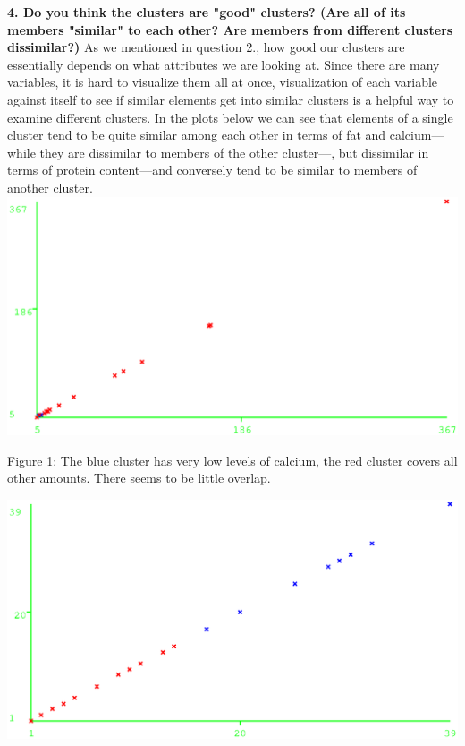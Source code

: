 \documentclass[]{article}
\begin{document}
\noindent\textbf{4. Do you think the clusters are "good" clusters? (Are all of its members "similar" to each other? Are members from different clusters dissimilar?)}
As we mentioned in question 2., how good our clusters are essentially depends on what attributes we are looking at. Since there are many variables, it is hard to visualize them all at once, visualization of each variable against itself to see if similar elements get into similar clusters is a helpful way to examine different clusters. In the plots below we can see that elements of a single cluster tend to be quite similar among each other in terms of fat and calcium---while they are dissimilar to members of the other cluster---, but dissimilar in terms of protein content---and conversely tend to be similar to members of another cluster.\\

\includegraphics[scale=0.65]{figures/calcium_calcium.eps}

\noindent Figure 1: The blue cluster has very low levels of calcium, the red cluster covers all other amounts. There seems to be little overlap.


\includegraphics[scale=0.65]{figures/fat_fat.eps}
\end{document}
